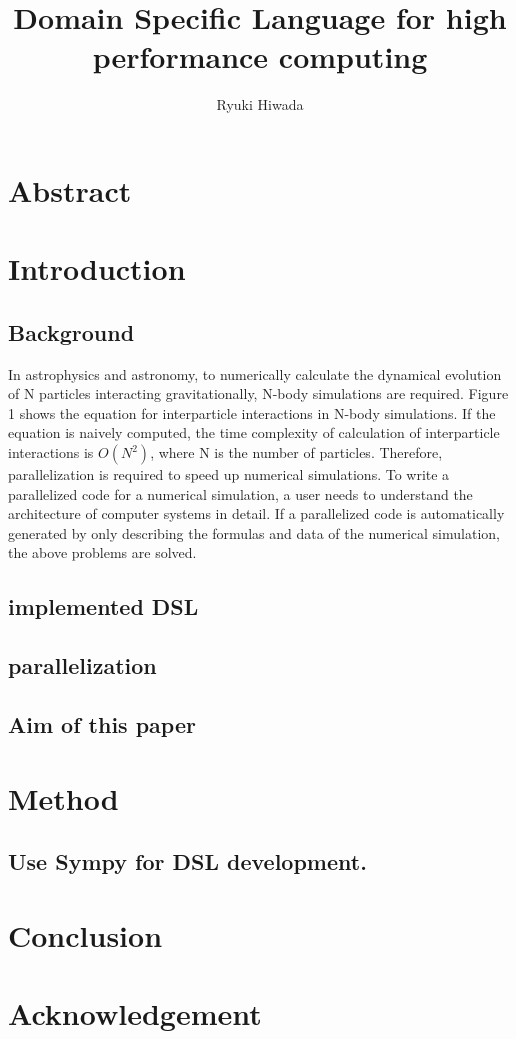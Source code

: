 \documentclass[ams]{U-AizuGT}
\author{Ryuki Hiwada}
\title{Domain Specific Language for high performance computing}
\begin{document}
\maketitle
\section{Abstract}
\section{Introduction}
\subsection{Background}
In astrophysics and astronomy, to numerically calculate 
the dynamical evolution of N particles interacting gravitationally, 
N-body simulations are required. Figure 1 shows the equation for 
interparticle interactions in N-body simulations. If the equation 
is naively computed, the time complexity of calculation of 
interparticle interactions is \begin{math}O(N^2) \end{math}, where N is the number of
particles. Therefore, parallelization is required to speed up 
numerical simulations. To write a parallelized code for a numerical
simulation, a user needs to understand the architecture of computer
systems in detail. If a parallelized code is automatically
generated by only describing the formulas and data of the numerical
simulation, the above problems are solved.


\subsection{implemented DSL}

\subsection{parallelization}

\subsection{Aim of this paper}

\section{Method}
\subsection{Use Sympy for DSL development.}

\section{Conclusion}
\section{Acknowledgement}

\end{document}
